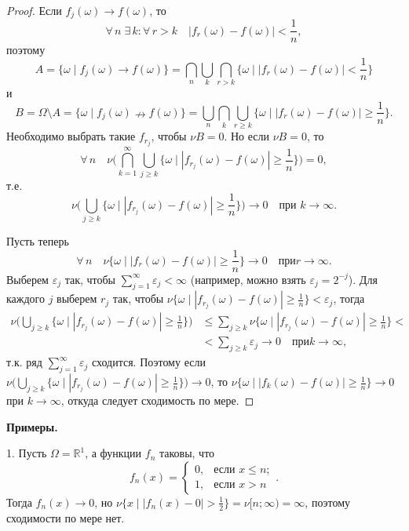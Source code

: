 \documentclass[12pt,titlepage]{article}
\newcommand{\prim}{\vspace{5pt}\noindent\textbf{Примеры.}}
\theoremstyle{definition}
\begin{document}
\begin{proof}
Если $f_j(\omega)\to f(\omega)$, то $$\forall\, n\;\exists\, k:
\forall\, r>k\quad |f_r(\omega)-f(\omega)|<\frac 1 n,$$ поэтому
$$A=\{\omega\mid f_j(\omega)\to f(\omega)\}=\bigcap\limits_n
\bigcup\limits_k \bigcap\limits_{r>k} \{\omega\mid
|f_r(\omega)-f(\omega)|<\frac 1 n\}$$ и
$$B=\Omega\setminus A=\{\omega\mid f_j(\omega)\nrightarrow
f(\omega)\}=\bigcup\limits_n \bigcap\limits_k
\bigcup\limits_{r\geqslant k} \{\omega\mid
|f_r(\omega)-f(\omega)|\geqslant\frac 1 n\}.$$ Необходимо выбрать
такие $f_{r_j}$, чтобы $\nu B=0$. Но если $\nu B=0$, то
$$\forall\, n\quad \nu\Big(\bigcap\limits_{k=1}^\infty \bigcup\limits_
{j\geqslant k}\{\omega\mid |f_{r_j}(\omega)-f(\omega)|\geqslant
\frac 1 n\}\Big)=0,$$ т.е. $$\nu\Big(\bigcup\limits_ {j\geqslant
k}\{\omega\mid |f_{r_j}(\omega)-f(\omega)|\geqslant \frac 1
n\}\Big)\to 0\quad \text{при $k\to\infty$}.$$

Пусть теперь $$\forall\, n\quad \nu\{\omega\mid
|f_r(\omega)-f(\omega)|\geqslant\frac 1 n\}\to 0\quad\text{при
$r\to\infty$}.$$ Выберем $\varepsilon_j$ так, чтобы
$\sum\limits_{j=1}^\infty \varepsilon_j<\infty$ (например, можно
взять $\varepsilon_j=2^{-j}$). Для каждого $j$ выберем $r_j$ так,
чтобы $\nu\{\omega\mid |f_{r_j}(\omega)-f(\omega)|\geqslant\frac 1
n\}<\varepsilon_j$, тогда
\begin{align*}
\nu\Big(\bigcup\limits_{j\geqslant k}\{\omega\mid |f_{r_j}(\omega)-
f(\omega)|\geqslant\frac 1 n\}\Big)&\leqslant\sum\limits_{j\geqslant
k}\nu\{\omega\mid |f_{r_j}(\omega)-f(\omega)|\geqslant\frac 1
n\}<\\
&<\sum\limits_{j\geqslant k}\varepsilon_j\to 0 \quad\text{при
$k\to\infty$},
\end{align*}
т.к. ряд $\sum\limits_{j=1}^\infty \varepsilon_j$ сходится. Поэтому
если $\nu\Big(\bigcup\limits_{j\geqslant k}\{\omega\mid
|f_{r_j}(\omega)- f(\omega)|\geqslant\frac 1 n\}\Big)\to 0$, то
$\nu\{\omega\mid |f_k(\omega)-f(\omega)|\geqslant\frac 1 n\}\to 0$
при $k\to\infty$, откуда следует сходимость по мере.
\end{proof}

\prim

1. Пусть $\Omega=\mathbb{R}^1$, а функции $f_n$ таковы, что
$$f_n(x)=\begin{cases}0,& \text{если $x\leqslant n$}; \\ 1,&
\text{если $x> n$}\end{cases}.$$ Тогда $f_n(x)\to 0$, но $\nu\{x\mid
|f_n(x)-0|>\frac 1 2\}=\nu[n;\infty)=\infty$, поэтому сходимости по
мере нет.
\end{document}
